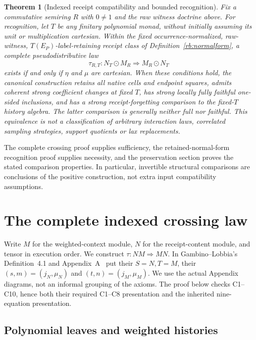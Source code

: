 \documentclass[11pt,a4paper]{article}
\newtheorem{theorem}{Theorem}[section]
\theoremstyle{definition}
\begin{document}
\begin{theorem}[Indexed receipt compatibility and bounded recognition]
\label{thm:main}
Fix a commutative semiring $R$ with $0\ne1$ and the raw witness doctrine
above. For recognition, let $T$ be any finitary polynomial monad, without
initially assuming its unit or multiplication cartesian. Within the fixed
occurrence-normalized, raw-witness, $T(E_P)$-label-retaining receipt class
of Definition~\ref{rb:normalform}, a complete pseudodistributive law
\[
 \tau_{R,T}:N_T\odot M_R\Longrightarrow M_R\odot N_T
\]
exists if and only if $\eta$ and $\mu$ are cartesian.
When these conditions hold, the canonical construction retains all native
cells and endpoint squares, admits coherent strong coefficient changes at
fixed $T$, has strong locally fully faithful one-sided inclusions, and has
a strong receipt-forgetting comparison to the fixed-$T$ history algebra.
The latter comparison is generally neither full nor faithful.
This equivalence is not a classification of arbitrary interaction laws,
correlated sampling strategies, support quotients or lax replacements.
\end{theorem}

The complete crossing proof supplies sufficiency, the retained-normal-form
recognition proof supplies necessity, and the preservation section proves
the stated comparison properties. In particular, invertible structural
comparisons are conclusions of the positive construction, not extra input
compatibility assumptions.

\section{The complete indexed crossing law}\label{xc:law}

Write $M$ for the weighted-context module, $N$ for the receipt-content
module, and tensor in execution order.  We construct
$\tau:NM\Rightarrow MN$. In Gambino--Lobbia's Definition~4.1 and Appendix~A~\cite{GambinoLobbia}
put their $S=N,T=M$, their $(s,m)=(j_N,\mu_N)$ and
$(t,n)=(j_M,\mu_M)$. We use the actual Appendix diagrams, not an informal
grouping of the axioms. The proof below checks C1--C10, hence both their
required C1--C8 presentation and the inherited nine-equation presentation.

\subsection{Polynomial leaves and weighted histories}
\end{document}
